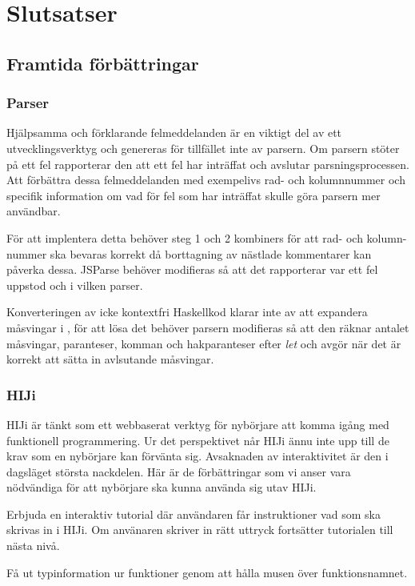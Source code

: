 \section{Slutsatser}

\subsection{Framtida förbättringar}


\subsubsection{Parser}
Hjälpsamma och förklarande felmeddelanden är en viktigt del av ett utvecklingsverktyg och genereras för tillfället inte av parsern. 
Om parsern stöter på ett fel rapporterar den att ett fel har inträffat och avslutar parsningsprocessen. 
Att förbättra dessa felmeddelanden med exempelivs rad- och kolumnnummer och specifik information om vad för fel som har inträffat skulle göra parsern mer användbar.

För att implentera detta behöver steg 1 och 2 kombiners för att rad- och kolumn-nummer ska bevaras korrekt då borttagning av nästlade kommentarer kan påverka dessa. 
JSParse behöver modifieras så att det rapporterar var ett fel uppstod och i vilken parser.

Konverteringen av icke kontextfri Haskellkod klarar inte av att expandera måsvingar i \empth{[x | let x = 5]},
för att lösa det behöver parsern modifieras så att den räknar antalet måsvingar, paranteser, komman och hakparanteser efter
\emph{let} och avgör när det är korrekt att sätta in avlsutande måsvingar.

\subsubsection{HIJi}
HIJi är tänkt som ett webbaserat verktyg för nybörjare att komma igång med funktionell programmering. Ur det perspektivet når HIJi ännu inte upp till de krav som en nybörjare kan förvänta sig. Avsaknaden av interaktivitet är den i dagsläget största nackdelen. Här är de förbättringar som vi anser vara nödvändiga för att nybörjare ska kunna använda sig utav HIJi.

Erbjuda en interaktiv tutorial där användaren får instruktioner vad som ska skrivas in i HIJi. Om använaren skriver in rätt uttryck fortsätter tutorialen till nästa nivå.

Få ut typinformation ur funktioner genom att hålla musen över funktionsnamnet. 
